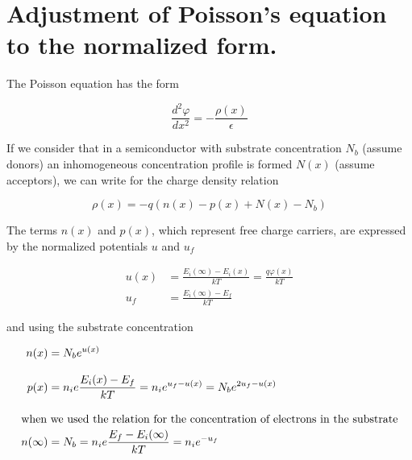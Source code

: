 
\chapter{Adjustment of Poisson's equation to the normalized form.}\label{app:AppendixB}

The Poisson equation has the form

\begin{equation}\label{eq:B.1}
  \frac{d^{2}\varphi}{dx^2} = - \frac{\rho(x)}{\epsilon}
\end{equation}

If we consider that in a semiconductor with substrate concentration
$N_b$ (assume donors) an inhomogeneous concentration profile is formed
$N(x)$ (assume acceptors), we can write for the charge density
relation

\begin{equation}\label{eq:B.2}
  \rho(x) = - q (n(x) - p(x) + N(x) -N_b)
\end{equation}

The terms $n(x)$ and $p(x)$, which represent free charge carriers, are
expressed by the normalized potentials $u$ and $u_f$

\begin{subequations}\label{eq:B.3}
  \begin{align}
    u(x) &= \frac{E_i(\infty) - E_i(x)}{kT} = \frac{q\varphi(x)}{kT} \label{eq:B.3a}\\[0.3cm]
    u_f &= \frac{E_i(\infty) - E_f}{kT} \label{eq:B.3b}
  \end{align}
\end{subequations}

and using the substrate concentration

\begin{subequations}\label{eq:B.4}
  \begin{align}
    n(x) &= N_b {e}^{u(x)}\label{eq:B.4a}\\[0.3cm]
    p(x) &= n_i {e}\frac{E_i(x) - E_f}{kT} = n_i {e}^{u_f-u(x)} = N_b {e}^{2u_f-u(x)}\label{eq:B.4b}\\[0.3cm]
    \intertext{when we used the relation for the concentration of electrons in the substrate}
    n(\infty) &= N_b = n_i {e}\frac{E_f-E_i(\infty)}{kT} = n_i {e}^{-u_f}\label{eq:B.4c}
  \end{align}
\end{subequations}

